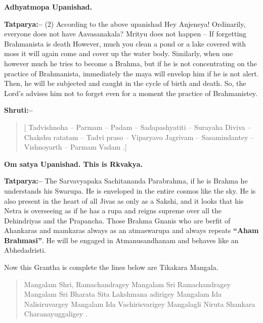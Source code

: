 \begin{flushright}
\textbf{Adhyatmopa Upanishad.}
\end{flushright}

\textbf{Tatparya:–} (2) According to the above upanishad Hey Anjeneya! Ordinarily, everyone does not have Aavasanakala? Mrityu does not happen – If forgetting Brahmanista is death However, much you clean a pond or a lake covered with moss it will again come and cover up the water body. Similarly, when one however much he tries to become a Brahma, but if he is not concentrating on the practice of Brahmanista, immediately the maya will envelop him if he is not alert. Then, he will be subjected and caught in the cycle of birth and death. So, the Lord's advises him not to forget even for a moment the practice of Brahmanistey.

\textbf{Shruti:–}

\begin{verse}
[ Tadvishnoha – Parmam – Padam – Sadapashyatiti – Surayaha  Diviva – Chakshu ratatam – Tadvi praso – Viparyavo Jagrivam – Sasamindantey – Vishnoyarth – Parmam Vadam .]
\end{verse}

\begin{flushright}
\textbf{Om satya Upanishad. This is Rkvakya.}
\end{flushright}

\textbf{Tatparya:–} The Sarvavyapaka Sachitananda Parabrahma, if he is Brahma he understands his Swarupa. He is enveloped in the entire cosmos like the sky. He is also present in the heart of all Jivas as only as a Sakshi, and it looks that his Netra is overseeing as if he has a rupa and reigns supreme over all the Dehindriyas and the Prapancha. Those Brahma Gnanis who are berfit of Ahankaras and mamkaras always as an atmaswarupa and always repeats \textbf{“Aham Brahmasi”}. He will be engaged in Atmanusandhanam and behaves like an Abhedadristi.

Now this Grantha is complete the lines below are Tikakara Mangala.

\begin{verse}
 Mangalam Shri, Ramachandragey  Mangalam Sri Ramachandragey  Mangalam Sri Bharata Sita Lakshmana adirigey  Mangalam Ida Nalisiruvargey  Mangalam Ida Vachirisvarigey  Mangalagli Niruta Shankara Charanayuggaligey .
\end{verse}


